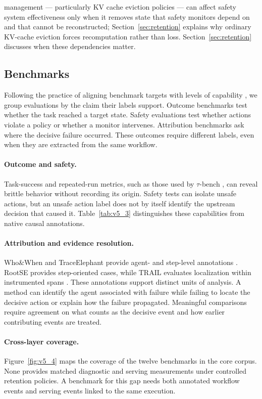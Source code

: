 \documentclass[preprint,12pt]{elsarticle}
\begin{document}
management --- particularly KV cache eviction policies --- can affect safety system effectiveness only when it removes state that safety monitors depend on and that cannot be reconstructed; Section~\ref{sec:retention} explains why ordinary KV-cache eviction forces recomputation rather than loss. Section~\ref{sec:retention} discusses when these dependencies matter.


\subsection{Benchmarks}

Following the practice of aligning benchmark targets with levels of capability \cite{survey_humor}, we group evaluations by the claim their labels support. Outcome benchmarks test whether the task reached a target state. Safety evaluations test whether actions violate a policy or whether a monitor intervenes. Attribution benchmarks ask where the decisive failure occurred. These outcomes require different labels, even when they are extracted from the same workflow.

\paragraph{Outcome and safety.}
Task-success and repeated-run metrics, such as those used by $\tau$-bench \cite{v5ref42}, can reveal brittle behavior without recording its origin. Safety tests can isolate unsafe actions, but an unsafe action label does not by itself identify the upstream decision that caused it. Table~\ref{tab:v5_3} distinguishes these capabilities from native causal annotations.

\paragraph{Attribution and evidence resolution.}
Who\&When and TraceElephant provide agent- and step-level annotations \cite{v5ref48,v5ref6}. RootSE provides step-oriented cases, while TRAIL evaluates localization within instrumented spans \cite{v5ref35,v5ref10}. These annotations support distinct units of analysis. A method can identify the agent associated with failure while failing to locate the decisive action or explain how the failure propagated. Meaningful comparisons require agreement on what counts as the decisive event and how earlier contributing events are treated.

\paragraph{Cross-layer coverage.}
Figure~\ref{fig:v5_4} maps the coverage of the twelve benchmarks in the core corpus. None provides matched diagnostic and serving measurements under controlled retention policies. A benchmark for this gap needs both annotated workflow events and serving events linked to the same execution.
\end{document}
